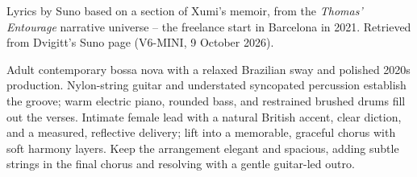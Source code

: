 
\begin{notes}
Lyrics by Suno based on a section of Xumi's memoir, from the \emph{Thomas' Entourage} narrative universe -- the freelance start in Barcelona in 2021. Retrieved from Dvigitt's Suno page (V6-MINI, 9 October 2026).
\end{notes}
\begin{style}
Adult contemporary bossa nova with a relaxed Brazilian sway and polished 2020s production. Nylon-string guitar and understated syncopated percussion establish the groove; warm electric piano, rounded bass, and restrained brushed drums fill out the verses. Intimate female lead with a natural British accent, clear diction, and a measured, reflective delivery; lift into a memorable, graceful chorus with soft harmony layers. Keep the arrangement elegant and spacious, adding subtle strings in the final chorus and resolving with a gentle guitar-led outro.
\end{style}
